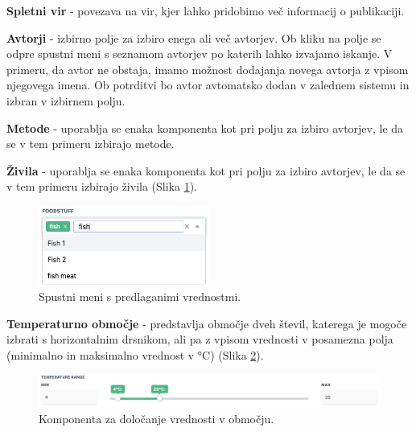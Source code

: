 \begin{description}
\item \textbf{Spletni vir} - povezava na vir, kjer lahko pridobimo več informacij o publikaciji.

\item \textbf{Avtorji} - izbirno polje za izbiro enega ali več avtorjev. Ob kliku na polje se odpre spustni meni s seznamom avtorjev po katerih lahko izvajamo iskanje. V primeru, da avtor ne obstaja, imamo možnost dodajanja novega avtorja z vpisom njegovega imena. Ob potrditvi bo avtor avtomatsko dodan v zalednem sistemu in izbran v izbirnem polju.

\item \textbf{Metode} - uporablja se enaka komponenta kot pri polju za izbiro avtorjev, le da se v tem primeru izbirajo metode.

\item \textbf{Živila} - uporablja se enaka komponenta kot pri polju za izbiro avtorjev, le da se v tem primeru izbirajo živila (Slika \ref{multiselect}).

\begin{figure}[h]
\begin{center}
\includegraphics[width=0.5\textwidth]{slike/multiselect.png}
\end{center}
\caption{ Spustni meni s predlaganimi vrednostmi. }
\label{multiselect}
\end{figure}

\item \textbf{Temperaturno območje} - predstavlja območje dveh števil, katerega je mogoče izbrati s horizontalnim drsnikom, ali pa z vpisom vrednosti v posamezna polja (minimalno in maksimalno vrednost v °C) (Slika  \ref{type-range}).

\begin{figure}[h]
\begin{center}
\includegraphics[width=1\textwidth]{slike/type_range.png}
\end{center}
\caption{ Komponenta za določanje vrednosti v območju. }
\label{type-range}
\end{figure}


\end{description}
